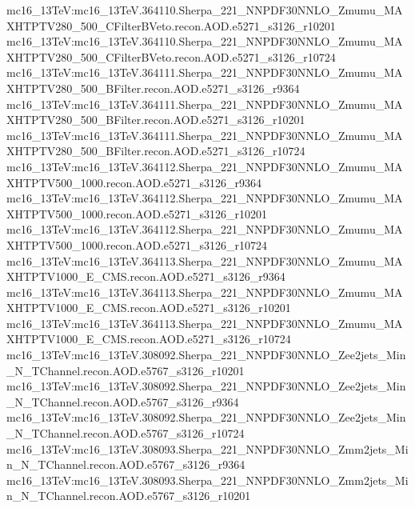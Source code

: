 { mc16\_13TeV:mc16\_13TeV.364110.Sherpa\_221\_NNPDF30NNLO\_Zmumu\_MAXHTPTV280\_500\_CFilterBVeto.recon.AOD.e5271\_s3126\_r10201 \newline    
 mc16\_13TeV:mc16\_13TeV.364110.Sherpa\_221\_NNPDF30NNLO\_Zmumu\_MAXHTPTV280\_500\_CFilterBVeto.recon.AOD.e5271\_s3126\_r10724 \newline    
 mc16\_13TeV:mc16\_13TeV.364111.Sherpa\_221\_NNPDF30NNLO\_Zmumu\_MAXHTPTV280\_500\_BFilter.recon.AOD.e5271\_s3126\_r9364 \newline    
 mc16\_13TeV:mc16\_13TeV.364111.Sherpa\_221\_NNPDF30NNLO\_Zmumu\_MAXHTPTV280\_500\_BFilter.recon.AOD.e5271\_s3126\_r10201 \newline    
 mc16\_13TeV:mc16\_13TeV.364111.Sherpa\_221\_NNPDF30NNLO\_Zmumu\_MAXHTPTV280\_500\_BFilter.recon.AOD.e5271\_s3126\_r10724 \newline    
 mc16\_13TeV:mc16\_13TeV.364112.Sherpa\_221\_NNPDF30NNLO\_Zmumu\_MAXHTPTV500\_1000.recon.AOD.e5271\_s3126\_r9364\newline     
 mc16\_13TeV:mc16\_13TeV.364112.Sherpa\_221\_NNPDF30NNLO\_Zmumu\_MAXHTPTV500\_1000.recon.AOD.e5271\_s3126\_r10201 \newline   
 mc16\_13TeV:mc16\_13TeV.364112.Sherpa\_221\_NNPDF30NNLO\_Zmumu\_MAXHTPTV500\_1000.recon.AOD.e5271\_s3126\_r10724 \newline    
 mc16\_13TeV:mc16\_13TeV.364113.Sherpa\_221\_NNPDF30NNLO\_Zmumu\_MAXHTPTV1000\_E\_CMS.recon.AOD.e5271\_s3126\_r9364 \newline    
 mc16\_13TeV:mc16\_13TeV.364113.Sherpa\_221\_NNPDF30NNLO\_Zmumu\_MAXHTPTV1000\_E\_CMS.recon.AOD.e5271\_s3126\_r10201 \newline    
 mc16\_13TeV:mc16\_13TeV.364113.Sherpa\_221\_NNPDF30NNLO\_Zmumu\_MAXHTPTV1000\_E\_CMS.recon.AOD.e5271\_s3126\_r10724 \newline    
 mc16\_13TeV:mc16\_13TeV.308092.Sherpa\_221\_NNPDF30NNLO\_Zee2jets\_Min\_N\_TChannel.recon.AOD.e5767\_s3126\_r10201 \newline    
 mc16\_13TeV:mc16\_13TeV.308092.Sherpa\_221\_NNPDF30NNLO\_Zee2jets\_Min\_N\_TChannel.recon.AOD.e5767\_s3126\_r9364 \newline    
 mc16\_13TeV:mc16\_13TeV.308092.Sherpa\_221\_NNPDF30NNLO\_Zee2jets\_Min\_N\_TChannel.recon.AOD.e5767\_s3126\_r10724 \newline    
 mc16\_13TeV:mc16\_13TeV.308093.Sherpa\_221\_NNPDF30NNLO\_Zmm2jets\_Min\_N\_TChannel.recon.AOD.e5767\_s3126\_r9364  \newline   
 mc16\_13TeV:mc16\_13TeV.308093.Sherpa\_221\_NNPDF30NNLO\_Zmm2jets\_Min\_N\_TChannel.recon.AOD.e5767\_s3126\_r10201  \newline   
}
